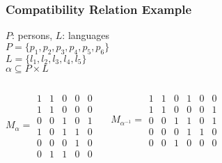 \documentclass[dvipsnames]{beamer}
\begin{document}
\begin{frame}
  \frametitle{Compatibility Relation Example}

  \begin{example}
    $P$: persons, $L$: languages\\
    $P=\{p_1,p_2,p_3,p_4,p_5,p_6\}$\\
    $L=\{l_1,l_2,l_3,l_4,l_5\}$\\

    \medskip
    $\alpha \subseteq P \times L$

    \pause
    \begin{columns}
      \[
        M_\alpha =
          \begin{array}{|ccccc|}
            1  &  1  &  0  &  0  &  0\\
            1  &  1  &  0  &  0  &  0\\
            0  &  0  &  1  &  0  &  1\\
            1  &  0  &  1  &  1  &  0\\
            0  &  0  &  0  &  1  &  0\\
            0  &  1  &  1  &  0  &  0
          \end{array}
      \]

      \[
        M_{\alpha^{-1}} =
          \begin{array}{|cccccc|}
            1  &  1  &  0  &  1  &  0  &  0\\
            1  &  1  &  0  &  0  &  0  &  1\\
            0  &  0  &  1  &  1  &  0  &  1\\
            0  &  0  &  0  &  1  &  1  &  0\\
            0  &  0  &  1  &  0  &  0  &  0
          \end{array}
      \]
    \end{columns}
  \end{example}
\end{frame}
\end{document}
